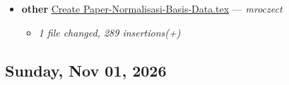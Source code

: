 \begin{itemize}[leftmargin=1.5em]
\begin{itemize}[leftmargin=1.5em]
    \item \small\textit{1 file changed, 1 insertion(+), 1 deletion(-)}
  \end{itemize}
  \item \textbf{other} \href{https://github.com/mroczect/mroczect.github.io/commit/ec526c392fd25061d9143aa2cbd4c1814786e3e2}{Create Paper-Normalisasi-Basis-Data.tex} --- \textit{mroczect}
  \begin{itemize}[leftmargin=1.5em]
    \item \small\textit{1 file changed, 289 insertions(+)}
  \end{itemize}
\end{itemize}

\subsection*{Sunday, Nov 01, 2026}

